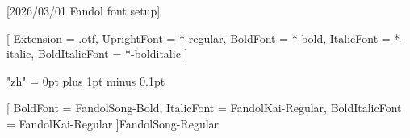 
[2026/03/01 Fandol font setup]


\setsansfont{texgyreheros}[
  Extension      = .otf,
  UprightFont    = *-regular,
  BoldFont       = *-bold,
  ItalicFont     = *-italic,
  BoldItalicFont = *-bolditalic
]


\usepackage[fontset=fandol]{ctex}



\XeTeXlinebreaklocale "zh"
\XeTeXlinebreakskip = 0pt plus 1pt minus 0.1pt


\newcommand{\thmheiti}{\heiti}
\newcommand{\sectionfont}{\bfseries\heiti}
\newcommand{\pffont}{\heiti}

\renewcommand{\em}{\bfseries\heiti}


%
%
[
  BoldFont       = FandolSong-Bold,
  ItalicFont     = FandolKai-Regular,
  BoldItalicFont = FandolKai-Regular
]{FandolSong-Regular}

